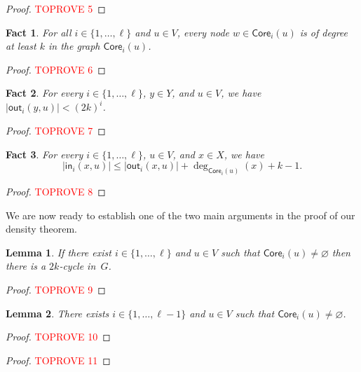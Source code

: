 \documentclass{article}
\newcommand{\F}{{\mathsf{out}}}
\renewcommand{\H}{{\mathsf{in}}}
\newcommand{\bp}{X}
\newcommand{\tp}{Y}
\newtheorem{lemma}{Lemma}
\newtheorem{fact}{Fact}
\begin{document}
\begin{proof}\textcolor{red}{TOPROVE 5}\end{proof}

\begin{fact}\label{fact:deg_ker}
    For all $i\in\{1,\dots,\ell\}$ and $u\in V$, every node $w\in\mathsf{Core}_i(u)$ is of degree at least $k$ in the graph $\mathsf{Core}_i(u)$. 
\end{fact}

\begin{proof}\textcolor{red}{TOPROVE 6}\end{proof}

\begin{fact}\label{fact:OUT_size}
    For every $i\in\{1,\dots,\ell\}$, $y\in \tp$, and $u\in V$, we have $|\F_i(y,u)|< (2k)^i$.
\end{fact}

\begin{proof}\textcolor{red}{TOPROVE 7}\end{proof}

\begin{fact}\label{fact:size_IN}
    For every $i\in\{1,\dots,\ell\}$, $u\in V$, and  $x\in \bp$, we have \[|\H_i(x,u)|\leq|\F_i(x,u)|+\deg_{\mathsf{Core}_i(u)}(x)+k-1.\]    
\end{fact}

\begin{proof}\textcolor{red}{TOPROVE 8}\end{proof}

We are now ready to establish one of the two main arguments in the proof of our density theorem. 

\begin{lemma}\label{lem:cycle}
    If there exist $i\in \{1,\dots,\ell\}$ and $u\in V$ such that $\mathsf{Core}_i(u)\neq\varnothing$ then there is a $2k$-cycle in~$G$.
\end{lemma}
\begin{proof}\textcolor{red}{TOPROVE 9}\end{proof}


\begin{lemma}\label{lem:ker}
    There exists $i\in\{1,\dots,\ell-1\}$ and $u \in V$ such that $\mathsf{Core}_i(u)\neq\varnothing$.
\end{lemma}

\begin{proof}\textcolor{red}{TOPROVE 10}\end{proof}

\begin{proof}\textcolor{red}{TOPROVE 11}\end{proof}
\end{document}
